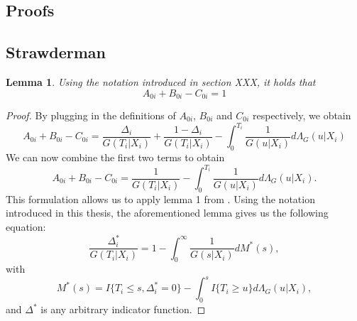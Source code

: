\documentclass[12pt, a4paper]{article}
\theoremstyle{definition}
\theoremstyle{plain}
\newtheorem{Lemma}{Lemma}[section]
\numberwithin{equation}{section}
\numberwithin{figure}{section}
\numberwithin{table}{section}
\begin{document}
	\begin{appendices}
		\section{Proofs}
		\subsection{Strawderman}\label{proof:strawderman}
		
		\begin{Lemma}\label{lem:equi}
			Using the notation introduced in section XXX, it holds that 
			\begin{equation*}
				A_{0i}+B_{0i}-C_{0i}=1
			\end{equation*}
		\end{Lemma}
		\begin{proof}
			By plugging in the definitions of $A_{0i}$, $B_{0i}$ and $C_{0i}$ respectively, we obtain
			\begin{equation*}
			A_{0i}+B_{0i}-C_{0i} = \frac{\Delta_i}{G(T_i\vert X_i)} + \frac{1-\Delta_i}{G(T_i\vert X_i)} - \int_{0}^{T_i}\frac{1}{G(u\vert X_i)}d\Lambda_G(u\vert X_i)
			\end{equation*}
			We can now combine the first two terms to obtain
			\begin{equation}\label{eq:lemma}
			A_{0i}+B_{0i}-C_{0i} = \frac{1}{G(T_i \vert X_i)} - \int_{0}^{T_i}\frac{1}{G(u\vert X_i)}d\Lambda_G(u\vert X_i).
			\end{equation}
			This formulation allows us to apply lemma 1 from \citet*{strawderman}.
			Using the notation introduced in this thesis, the aforementioned lemma gives us the following equation:
			\begin{equation}\label{eq:straw}
			\frac{\Delta^*_i}{G(T_i\vert X_i)} = 1 - \int_{0}^{\infty} \frac{1}{G(s\vert X_i)} dM^*(s),
			\end{equation}
			with
			\begin{equation*}
			M^*(s) = I\{T_i \leq s, \Delta^*_i=0\} - \int_{0}^s I\{T_i\geq u\}d\Lambda_G(u\vert X_i),
			\end{equation*}
			and $\Delta^*$ is any arbitrary indicator function.
			

\end{proof}
\end{appendices}
\end{document}
